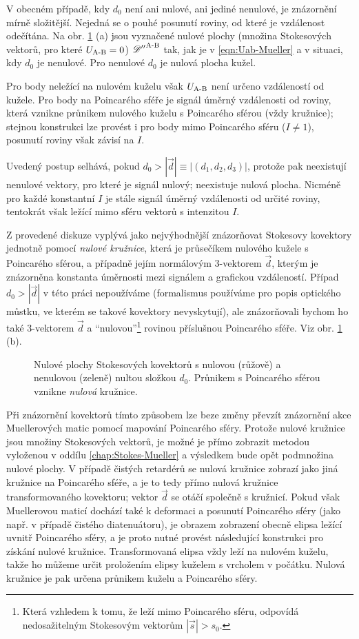 V obecném případě, kdy $d_0$ není ani nulové, ani jediné nenulové, je znázornění mírně složitější.
Nejedná se o pouhé posunutí roviny, od které je vzdálenost odečítána.
Na obr. \ref{fig:mustek-znazorneni-kovektoru} (a) jsou vyznačené nulové plochy (množina Stokesových vektorů, pro které $U_\textrm{A-B}=0$) ${\mathscr{D}''}^\textrm{A-B}$ tak, jak je v \eqref{eqn:Uab-Mueller} a v situaci, kdy $d_0$ je nenulové.
Pro nenulové $d_0$ je nulová plocha kužel.

Pro body neležící na nulovém kuželu však $U_\textrm{A-B}$ není určeno vzdáleností od kužele.
Pro body na Poincarého sféře je signál úměrný vzdálenosti od roviny, která vznikne průnikem nulového kuželu s Poincarého sférou (vždy kružnice); stejnou konstrukci lze provést i pro body mimo Poincarého sféru ($I\neq1$), posunutí roviny však závisí na $I$.

Uvedený postup selhává, pokud $d_0>|\vec{d}|\equiv|(d_1, d_2, d_3)|$, protože pak neexistují nenulové vektory, pro které je signál nulový; neexistuje nulová plocha.
Nicméně pro každé konstantní $I$ je stále signál úměrný vzdálenosti od určité roviny, tentokrát však ležící mimo sféru vektorů s intenzitou $I$.

Z provedené diskuze vyplývá jako nejvýhodnější znázorňovat Stokesovy kovektory jednotně pomocí \emph{nulové kružnice}, která je průsečíkem nulového kužele s Poincarého sférou, a případně jejím normálovým 3-vektorem $\vec{d}$, kterým je znázorněna konstanta úměrnosti mezi signálem a grafickou vzdáleností.
Případ $d_0>|\vec{d}|$ v této práci nepoužíváme (formalismus používáme pro popis optického můstku, ve kterém se takové kovektory nevyskytují), ale znázorňovali bychom ho také 3-vektorem $\vec{d}$ a ``nulovou''\footnote{Která vzhledem k tomu, že leží mimo Poincarého sféru, odpovídá nedosažitelným Stokesovým vektorům $|\vec{s}|>s_0$.} rovinou příslušnou Poincarého sféře.
Viz obr. \ref{fig:mustek-znazorneni-kovektoru} (b).

\begin{figure}[htbp]
    \centering
    
    \caption{Nulové plochy Stokesových kovektorů s nulovou (růžově) a nenulovou (zeleně) nultou složkou $d_0$. Průnikem s Poincarého sférou vznikne \emph{nulová} kružnice.}
    \label{fig:mustek-znazorneni-kovektoru}
\end{figure}

Při znázornění kovektorů tímto způsobem lze beze změny převzít znázornění akce Muellerových matic pomocí mapování Poincarého sféry.
Protože nulové kružnice jsou množiny Stokesových vektorů, je možné je přímo zobrazit metodou vyloženou v oddílu \ref{chap:Stokes-Mueller} a výsledkem bude opět podmnožina nulové plochy.
V případě čistých retardérů se nulová kružnice zobrazí jako jiná kružnice na Poincarého sféře, a je to tedy přímo nulová kružnice transformovaného kovektoru; vektor $\vec{d}$ se otáčí společně s kružnicí.
Pokud však Muellerovou maticí dochází také k deformaci a posunutí Poincarého sféry (jako např. v případě čistého diatenuátoru), je obrazem zobrazení obecně elipsa ležící uvnitř Poincarého sféry, a je proto nutné provést následující konstrukci pro získání nulové kružnice.
Transformovaná elipsa vždy leží na nulovém kuželu, takže ho můžeme určit proložením elipsy kuželem s vrcholem v počátku.
Nulová kružnice je pak určena průnikem kuželu a Poincarého sféry.
